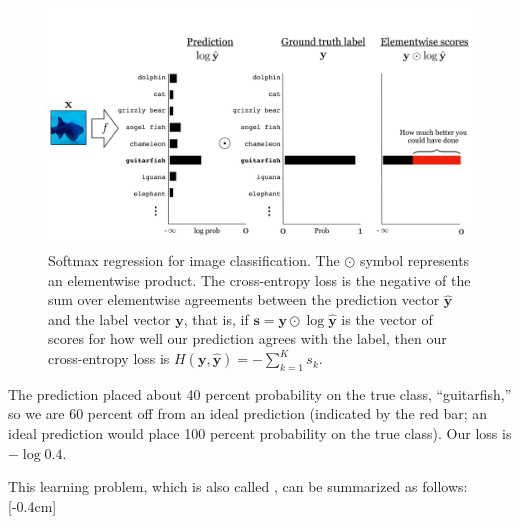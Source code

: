 \begin{figure}[h]
    \centering
    \includegraphics[width=1.0\linewidth]{./figures/intro_to_learning/softmax_regression_diagram.pdf}
    \caption{Softmax regression for image classification. The $\odot$ symbol represents an elementwise product. The cross-entropy loss is the negative of the sum over elementwise agreements between the prediction vector $\hat{\mathbf{y}}$ and the label vector $\mathbf{y}$, that is, if $\mathbf{s} = \mathbf{y} \odot \log \hat{\mathbf{y}}$ is the vector of scores for how well our prediction agrees with the label, then our cross-entropy loss is $H(\mathbf{y}, \hat{\mathbf{y}}) = - \sum_{k=1}^K s_k$.}
    \label{fig:softmax_regression_diagram}
\end{figure}

The prediction placed about 40 percent probability on the true class, ``guitarfish,'' so we are 60 percent off from an ideal prediction (indicated by the red bar; an ideal prediction would place 100 percent probability on the true class). Our loss is $-\log 0.4$.

This learning problem, which is also called , can be summarized as follows:[-0.4cm]

